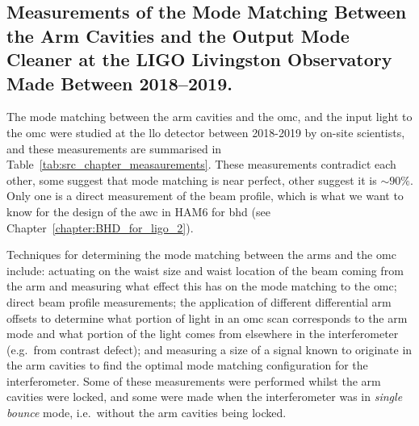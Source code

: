 \subsection{Measurements of the Mode Matching Between the Arm Cavities and the Output Mode Cleaner at the LIGO Livingston Observatory Made Between 2018--2019.}
\label{sec:beam_parameter_chapter_measurements}
The mode matching between the arm cavities and the \gls{omc}, and the input light to the \gls{omc} were studied at the \gls{llo} detector between 2018-2019 by on-site scientists, and these measurements are summarised in Table~\ref{tab:src_chapter_measaurements}. These measurements contradict each other, some suggest that mode matching is near perfect, other suggest it is $\sim\!90\%$. Only one is a direct measurement of the beam profile, which is what we want to know for the design of the \gls{awc} in HAM6 for \gls{bhd} (see Chapter~\ref{chapter:BHD_for_ligo_2}).
\par
Techniques for determining the mode matching between the arms and the \gls{omc} include: actuating on the waist size and waist location of the beam coming from the arm and measuring what effect this has on the mode matching to the \gls{omc}; direct beam profile measurements; the application of different differential arm offsets to determine what portion of light in an \gls{omc} scan corresponds to the arm mode and what portion of the light comes from elsewhere in the interferometer (e.g.~from contrast defect); and measuring a size of a signal known to originate in the arm cavities to find the optimal mode matching configuration for the interferometer. Some of these measurements were performed whilst the arm cavities were locked, and some were made when the interferometer was in \emph{single bounce} mode, i.e.~without the arm cavities being locked.
